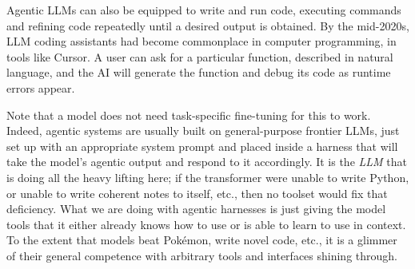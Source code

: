 Agentic LLMs can also be equipped to write and run code, executing commands and refining code repeatedly until a desired output is obtained.
By the mid-2020s, LLM coding assistants had become commonplace in computer
programming, in tools like Cursor. A user can ask for a particular function,
described in natural language, and the AI will generate the function and debug
its code as runtime errors appear.

Note that a model does not need task-specific fine-tuning for this
to work. Indeed, agentic systems are usually built on general-purpose frontier
LLMs, just set up with an appropriate system prompt and placed inside a
harness that will take the model's agentic output and respond to it accordingly. It is
the \emph{LLM} that is doing all the heavy lifting here; if the transformer
were unable to write Python, or unable to write coherent notes to itself, etc.,
then no toolset would fix that deficiency. What we are doing with agentic
harnesses is just giving the model tools that it either already knows how to use
or is able to learn to use in context. To the extent that models beat Pok\'emon,
write novel code, etc., it is a glimmer of their general competence with
arbitrary tools and interfaces shining through.





